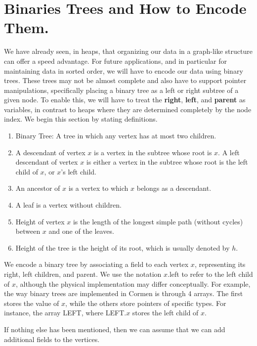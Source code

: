 \section{Binaries Trees and How to Encode Them.} We have already seen, in heaps, that organizing our data in a graph-like structure can offer a speed advantage. For future applications, and in particular for maintaining data in sorted order, we will have to encode our data using binary trees. These trees may not be almost complete and also have to support pointer manipulations, specifically placing a binary tree as a left or right subtree of a given node. To enable this, we will have to treat the \textbf{right}, \textbf{left}, and \textbf{parent} as variables, in contrast to heaps where they are determined completely by the node index. We begin this section by stating definitions.


\begin{definition}
  \begin{enumerate}
    \item Binary Tree: A tree in which any vertex has at most two children.
    \item A descendant of vertex $x$ is a vertex in the subtree whose root is $x$. A left descendant of vertex $x$ is either a vertex in the subtree whose root is the left child of $x$, or $x$'s left child.
    \item An ancestor of $x$ is a vertex to which $x$ belongs as a descendant.
    \item A leaf is a vertex without children.
    \item Height of vertex $x$ is the length of the longest simple path (without cycles) between $x$ and one of the leaves.
    \item Height of the tree is the height of its root, which is usually denoted by $h$.
\end{enumerate}
\end{definition}

We encode a binary tree by associating a field to each vertex $x$, representing its right, left children, and parent. We use the notation $x$.left to refer to the left child of $x$, although the physical implementation may differ conceptually. For example, the way binary trees are implemented in Cormen is through 4 arrays. The first stores the value of $x$, while the others store pointers of specific types. For instance, the array LEFT, where LEFT.$x$ stores the left child of $x$.


If nothing else has been mentioned, then we can assume that we can add additional fields to the vertices.



